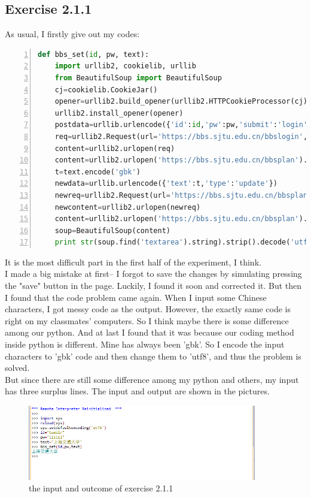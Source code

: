 \documentclass{article}
\begin{document}
\subsection{Exercise 2.1.1}
As usual, I firstly give out my codes:\\
\begin{lstlisting}[language=python,numbers=left,frame=leftline]
def bbs_set(id, pw, text):
    import urllib2, cookielib, urllib
    from BeautifulSoup import BeautifulSoup
    cj=cookielib.CookieJar()
    opener=urllib2.build_opener(urllib2.HTTPCookieProcessor(cj))
    urllib2.install_opener(opener)
    postdata=urllib.urlencode({'id':id,'pw':pw,'submit':'login'})
    req=urllib2.Request(url='https://bbs.sjtu.edu.cn/bbslogin',data=postdata)
    content=urllib2.urlopen(req)
    content=urllib2.urlopen('https://bbs.sjtu.edu.cn/bbsplan').read()
    t=text.encode('gbk')
    newdata=urllib.urlencode({'text':t,'type':'update'})
    newreq=urllib2.Request(url='https://bbs.sjtu.edu.cn/bbsplan',data=newdata)
    newcontent=urllib2.urlopen(newreq)
    content=urllib2.urlopen('https://bbs.sjtu.edu.cn/bbsplan').read()
    soup=BeautifulSoup(content)
    print str(soup.find('textarea').string).strip().decode('utf8')
\end{lstlisting}
It is the most difficult part in the first half of the experiment, I think.\\
I made a big mistake at first-- I forgot to save the changes by simulating pressing the "save" button in the page. Luckily, I found it soon and corrected it. But then I found that the code problem came again. When I input some Chinese characters, I got messy code as the output. However, the exactly same code is right on my classmates' computers. So I think maybe there is some difference among our python. And at last I found that it was because our coding method inside python is different. Mine has always been 'gbk'. So I encode the input characters to 'gbk' code and then change them to 'utf8', and thus the problem is solved.\\
But since there are still some difference among my python and others, my input has three surplus lines. The input and output are shown in the pictures. \\
\begin{figure}[htbp]
\centering
\includegraphics[width=10cm]{1.png}
\caption{the input and outcome of exercise 2.1.1}
\end{figure}
\end{document}
